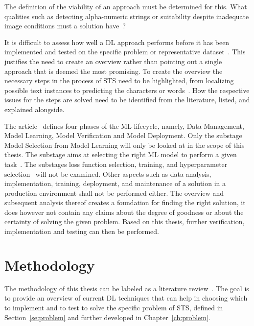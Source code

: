 The definition of the viability of an approach must be determined for this.
What qualities such as detecting alpha-numeric strings or suitability despite
inadequate image conditions must a solution have~\citep{ghosh_visual_2017, hu_gtc_2020}?

It is difficult to assess how well a \ac{DL} approach performs before it has been
implemented and tested on the specific problem or representative dataset~\citep{arpteg_software_2018}.
This justifies the need to create an overview rather than pointing out a single approach that is
deemed the most promising.
To create the overview the necessary steps in the process of \ac{STS} need to be highlighted,
from localizing possible text instances to predicting the characters or
words~\citep{long_scene_2021, sourvanos_challenges_2018}.
How the respective issues for the steps are solved need to be
identified from the literature, listed, and explained alongside.

The article~\cite{ashmore_assuring_2021} defines four phases of the \ac{ML} lifecycle, namely,
Data Management, Model Learning, Model Verification and Model Deployment.
Only the substage Model Selection from Model Learning will only be looked at in the scope of this
thesis.
The substage aims at selecting the right \ac{ML} model to perform a given
task~\citep{ashmore_assuring_2021}.
The substages loss function selection, training, and hyperparameter
selection~\citep{ashmore_assuring_2021} will not be examined.
Other aspects such as data analysis, implementation, training, deployment, and maintenance of a
solution in a production environment shall not be performed either.
The overview and subsequent analysis thereof creates a foundation for finding the right solution,
it does however not contain any claims about the degree of goodness or about the certainty of
solving the given problem.
Based on this thesis, further verification, implementation and testing can then be performed.

\section{Methodology}\label{se:methodology}
The methodology of this thesis can be labeled as a literature review~\citep{snyder_literature_2019,
torraco_writing_2005}.
The goal is to provide an overview of current \ac{DL} techniques that can help in
choosing which to implement and to test to solve the specific problem of \ac{STS}, defined in
Section~\ref{se:problem} and further developed in Chapter~\ref{ch:problem}.

